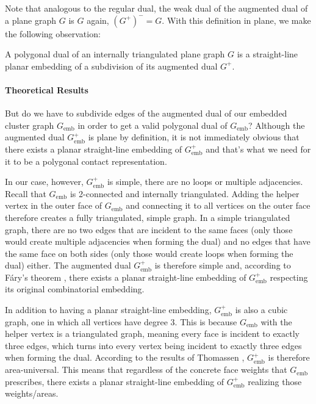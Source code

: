 Note that analogous to the regular dual, the weak dual of the augmented dual of a plane graph $G$ is $G$ again, \ie{} $(G^+)^- = G$. With this definition in plane, we make the following observation:

\begin{corollary}
	A polygonal dual of an internally triangulated plane graph $G$ is a straight-line planar embedding of a subdivision of its augmented dual $G^+$.
\end{corollary}



\paragraph{Theoretical Results}

But do we have to subdivide edges of the augmented dual of our embedded cluster graph $G_\text{emb}$ in order to get a valid polygonal dual of $G_\text{emb}$? Although the augmented dual $G_\text{emb}^+$ is plane by definition, it is not immediately obvious that there exists a planar straight-line embedding of $G_\text{emb}^+$ \emdash{} and that's what we need for it to be a polygonal contact representation.

In our case, however, $G_\text{emb}^+$ is simple, \ie{} there are no loops or multiple adjacencies. Recall that $G_\text{emb}$ is 2-connected and internally triangulated. Adding the helper vertex in the outer face of $G_\text{emb}$ and connecting it to all vertices on the outer face therefore creates a fully triangulated, simple graph. In a simple triangulated graph, there are no two edges that are incident to the same faces (only those would create multiple adjacencies when forming the dual) and no edges that have the same face on both sides (only those would create loops when forming the dual) either. The augmented dual $G_\text{emb}^+$ is therefore simple and, according to Fáry's theorem \cite{fary1948straight}, there exists a planar straight-line embedding of $G_\text{emb}^+$ respecting its original combinatorial embedding.

In addition to having a planar straight-line embedding, $G_\text{emb}^+$ is also a cubic graph, \ie{} one in which all vertices have degree 3. This is because $G_\text{emb}$ with the helper vertex is a triangulated graph, meaning every face is incident to exactly three edges, which turns into every vertex being incident to exactly three edges when forming the dual. According to the results of Thomassen \cite{thomassen1992plane}, $G_\text{emb}^+$ is therefore area-universal. This means that regardless of the concrete face weights that $G_\text{emb}$ prescribes, there exists a planar straight-line embedding of $G_\text{emb}^+$ realizing those weights/areas.

